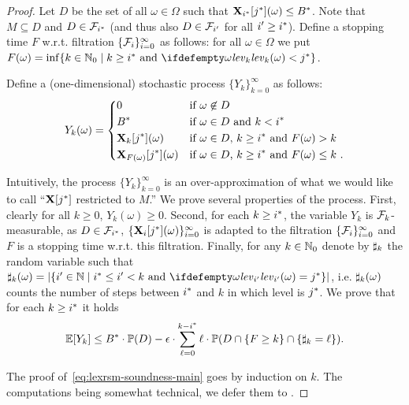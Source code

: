 \begin{proof}
Let $D$ be the set of all $\omega\in \Omega$ such that 
$\mathbf{X}_{{i}^*}[{j}^*](\omega)\leq {B}^*$. Note that $M \subseteq D$ and $D\in 
\mathcal{F}_{{i}^*}$ (and thus also $D\in \mathcal{F}_{i'}$ for all $i'\geq {i}^*$). 
Define a stopping time $F$ w.r.t. filtration $\{\mathcal{F}_i\}_{i=0}^{\infty}$ as follows: for all $\omega \in \Omega$ 
we put 
$F(\omega)=\inf\{k\in \Nset_0 \mid k\geq \fixn{i} \text{ and }
\levelrank{\omega}{k} < \fixn{j} \}$.

Define a 
(one-dimensional) stochastic process $\{Y_k\}_{k=0}^{\infty}$ as 
follows:
$$
Y_k(\omega) = \begin{dcases}
0 & \text{if $\omega \not\in D$}\\
{B}^* & \text{if $\omega \in D$ and $k<{i}^*$ }\\
\mathbf{X}_{k}[{j}^*](\omega) & \text{if $\omega \in D$, $k\geq {i}^*$ and 
$F(\omega)>k$ 
}\\
\mathbf{X}_{F(\omega)}[{j}^*](\omega) & \text{if $\omega\in D$, $k\geq 
{i}^*$ and 
$F(\omega)\leq k$ }.
\end{dcases}
$$
\vspace{-3mm}

Intuitively, the process $\{Y_k\}_{k=0}^{\infty}$ is an over-approximation of what we would like to call ``$\mathbf{X}[{j}^*]$ restricted to $M$.''
We prove several properties of the process. 
First, clearly for all $k\geq 0$, $Y_k(\omega)\geq 0$. Second, for each $k\geq {i}^*$, the variable $Y_k$ is $\mathcal{F}_k$-measurable, as $D\in \mathcal{F}_{{i}^*}$, $\{\mathbf{X}_{i}[{j}^*](\omega)\}_{i=0}^{\infty}$ is adapted to the filtration $\{\mathcal{F}_i\}_{i=0}^{\infty}$ and $F$ is a stopping time w.r.t. this filtration. Finally, for any $k\in \mathbb{N}_0$ denote by 
$\sharp_k$ the random variable such that $\noofdec_k(\omega) = |\{i'\in 
\Nset\mid \fixn{i} \leq i' < k \text{ and } \levelrank{\omega}{i'}=\fixn{j}\} |$, i.e. $\sharp_k(\omega)$ counts the number of steps between ${i}^*$ and $k$ in which level is ${j}^*$.
We prove
that for each $k\geq {i}^*$ 
it holds 
\begin{equation}
\label{eq:lexrsm-soundness-main}
\mathbb{E}[Y_k]\leq {B}^*\cdot \mathbb{P}(D) - \epsilon\cdot\sum_{\ell=0}^{k-{i}^*} \ell\cdot\mathbb{P}(D 
\cap \{F\geq k\} \cap \{\sharp_k 
= 
\ell\}).
\end{equation}


The proof of~\eqref{eq:lexrsm-soundness-main} goes by induction on $k$. The computations being somewhat technical, we defer them to \AppendixMaterial. 


\end{proof}

